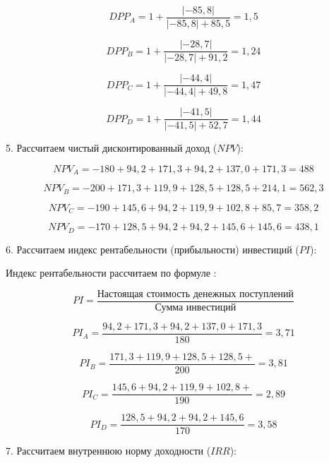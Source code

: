 \[ DPP_A =  1 + \dfrac{|-85,8|}{|-85,8| + 85,5} = 1,5\]

\[ DPP_B =  1 + \dfrac{|-28,7|}{|-28,7| + 91,2} = 1,24\]

\[ DPP_C =  1 + \dfrac{|-44,4|}{|-44,4| + 49,8} = 1,47 \]

\[ DPP_D = 1+ \dfrac{|-41,5|}{|-41,5| + 52,7} = 1,44 \]

5. Рассчитаем чистый дисконтированный доход ($NPV$):

\[ NPV_A =  -180 + 94,2  +171,3 + 94,2  + 137,0 + 171,3  = 488\]

\[ NPV_B =-200 +171,3 + 119,9 + 128,5 + 128,5 + 214,1 =562,3\]

\[ NPV_C =  -190+145,6+94,2+119,9+102,8+85,7=358,2\]

\[ NPV_D = -170+128,5+94,2+94,2+145,6+145,6=438,1\]

6. Рассчитаем индекс рентабельности (прибыльности) инвестиций ($PI$):

Индекс рентабельности рассчитаем по формуле \cite[218]{leontev}:

\[ PI = \dfrac{\text{Настоящая стоимость денежных поступлений}}{\text{Сумма инвестиций}} \]

\[ PI_A = \dfrac{94,2 +	171,3 +	94,2 	+137,0 +171,3
}{180}= 3,71\]

\[ PI_B = \dfrac{171,3 +	119,9 +	128,5 	+128,5 
+}{200}=3,81 \]

\[ PI_C = \dfrac{145,6 +	94,2 +	119,9 +	102,8 +}{190}= 2,89\]

\[ PI_D = \dfrac{128,5 +	94,2 +	94,2 +	145,6 
}{170}= 3,58\]

7. Рассчитаем внутреннюю норму доходности ($IRR$):







\begin{table}[!h]
		\label{final11}
	\caption{Показатели эффективности инвестиционных проектов}
\end{table}

